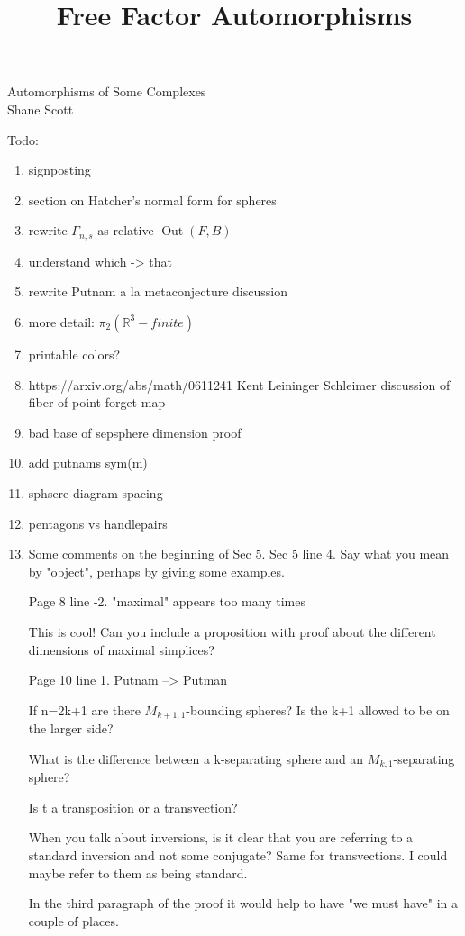 \documentclass[11pt]{article}
\title{Free Factor Automorphisms}
\newcommand{\R}{\mathbb{R}}
\DeclareMathOperator{\oout}{Out}
\theoremstyle{remark}
\theoremstyle{definition}
\begin{document}
\begin{center}
{Automorphisms of Some Complexes}\\
Shane Scott
\end{center}

Todo:
\begin{enumerate}
  \item signposting
  \item section on Hatcher's normal form for spheres
  \item rewrite $\Gamma_{n,s}$ as relative $\oout(F,B)$
  \item understand which -> that
  \item rewrite Putnam a la metaconjecture discussion
  \item more detail: $\pi_2 (\R^3 - finite)$
  \item printable colors?
  \item https://arxiv.org/abs/math/0611241
  Kent Leininger Schleimer discussion of fiber of point forget map
  \item bad base of sepsphere dimension proof
  \item add putnams sym(m)
  \item sphsere diagram spacing
  \item pentagons vs handlepairs
  \item Some comments on the beginning of Sec 5.
Sec 5 line 4.  Say what you mean by "object", perhaps by giving some
examples.

Page 8 line -2.  "maximal" appears too many times

This is cool!  Can you include a proposition with proof about the
different dimensions of maximal simplices?

Page 10 line 1.  Putnam --> Putman

If n=2k+1 are there $M_{k+1,1}$-bounding spheres?  Is the k+1 allowed to
be on the larger side?

What is the difference between a k-separating sphere and an
$M_{k,1}$-separating sphere?

Is t a transposition or a transvection?

When you talk about inversions, is it clear that you are referring to a
standard inversion and not some conjugate?  Same for transvections.  I
could maybe refer to them as being standard.

In the third paragraph of the proof it would help to have "we must have"
in a couple of places.


\end{enumerate}
\end{document}
